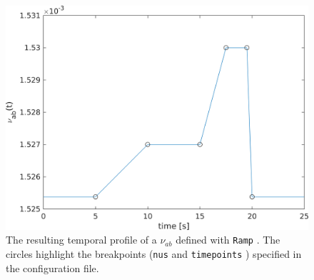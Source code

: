 \documentclass[12pt,a4paper]{article}
\newcommand{\type}[1]{{\small\small\tt #1} }
\begin{document}
\begin{itemize}
\begin{description}
    \begin{figure}[h]
        \begin{center}
            \includegraphics[width=\textwidth]{img/nftsim_coupling_ramp.png}
            \caption{The resulting temporal profile of a $\nu_{ab}$ defined with \type{Ramp}. The circles highlight the breakpoints (\type{nus} and \type{timepoints}) specified in the configuration file.}
       \end{center}
    \end{figure}








\end{description}
\end{itemize}
\end{document}
